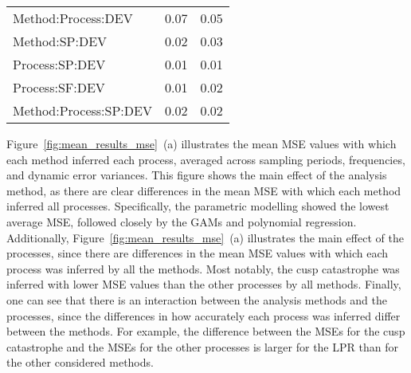 \documentclass[man, floatsintext]{apa7}
\begin{document}
\begin{table}[tbp]
\begin{center}
\begin{threeparttable}
\begin{tabular}{lll}
        \\
        Method:Process:DEV    & 0.07                                     & 0.05
        \\
        Method:SP:DEV         & 0.02                                     & 0.03
        \\
        Process:SP:DEV        & 0.01                                     & 0.01
        \\
        Process:SF:DEV        & 0.01                                     & 0.02
        \\
        Method:Process:SP:DEV & 0.02                                     & 0.02
        \\
        \bottomrule
      \end{tabular}
    \end{threeparttable}
  \end{center}

\end{table}

Figure~\ref{fig:mean_results_mse}~(a) illustrates the mean MSE values with
which each method inferred each process, averaged across sampling periods,
frequencies, and dynamic error variances. This figure shows the main effect of
the analysis method, as there are clear differences in the mean MSE with which
each method inferred all processes. Specifically, the parametric modelling
showed the lowest average MSE, followed closely by the GAMs and polynomial
regression. Additionally, Figure~\ref{fig:mean_results_mse}~(a) illustrates the
main effect of the processes, since there are differences in the mean MSE
values with which each process was inferred by all the methods. Most notably,
the cusp catastrophe was inferred with lower MSE values than the other
processes by all methods. Finally, one can see that there is an interaction
between the analysis methods and the processes, since the differences in how
accurately each process was inferred differ between the methods. For example,
the difference between the MSEs for the cusp catastrophe and the MSEs for the
other processes is larger for the LPR than for the other considered methods.

\begin{sidewaysfigure*}[htbp]
  \caption{Mean MSE effects}
  \label{fig:mean_results_mse}
\end{sidewaysfigure*}
\end{document}
